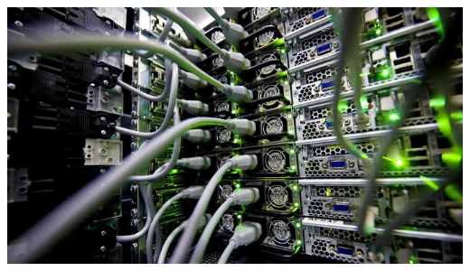 \documentclass{beamer}
\begin{document}
\begin{frame}
\begin{minipage}[t]{0.95\textwidth}
\begin{columns}
\begin{column}{0.5\textwidth}
                \includegraphics[width=1.1\textwidth]{Server_back.jpg}
            \end{column}
        \end{columns}
    \end{minipage}
\end{frame}

\end{document}
